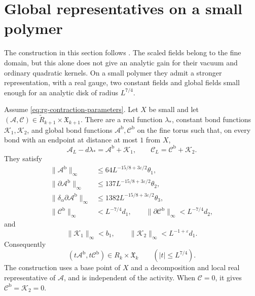 \section{Global representatives on a small polymer}
\label{subsec:rg-small-polymer-gauge}

The construction in this section follows \cite[\S12.7]{QED3Manuscript}.
The scaled fields belong to the fine domain, but this alone
does not give an analytic gain for their vacuum and ordinary
quadratic kernels. On a small polymer they admit a stronger
representation, with a real gauge, two constant fields and
global fields small enough for an analytic disk of radius
$L^{7/4}$.

\begin{proposition}\label{prop:rg-small-polymer-representatives}
Assume \eqref{eq:rg-contraction-parameters}. Let $X$ be small
and let $(\mathscr A,\mathscr C)\in
\widetilde R_{k+1}\times\mathfrak X_{k+1}$.
There are a real function $\lambda_*$, constant bond
functions $\mathscr K_1,\mathscr K_2$, and global bond
functions $\mathscr A^{\mathrm b},\mathscr C^{\mathrm b}$
on the fine torus such that, on every bond with an endpoint
at distance at most $1$ from $X$,
\begin{equation}\label{eq:rg-small-polymer-gauge-identity}
 \mathscr A_L-d\lambda_*=\mathscr A^{\mathrm b}+\mathscr K_1,
 \qquad
 \mathscr C_L=\mathscr C^{\mathrm b}+\mathscr K_2.
\end{equation}
They satisfy
\begin{equation}\label{eq:rg-small-polymer-global-bounds}
 \begin{split}
 \|\mathscr A^{\mathrm b}\|_\infty
          &\le64L^{-15/8+3\varepsilon/2}\theta_1,\\
 \|\partial\mathscr A^{\mathrm b}\|_\infty
          &\le137L^{-15/8+3\varepsilon/2}\theta_2,\\
 \|\delta_\alpha\partial\mathscr A^{\mathrm b}\|_\infty
          &\le1382L^{-15/8+3\varepsilon/2}\theta_3,\\
 \|\mathscr C^{\mathrm b}\|_\infty&<L^{-7/4}d_1,\qquad
 \|\partial\mathscr C^{\mathrm b}\|_\infty<L^{-7/4}d_2,
 \end{split}
\end{equation}
and
\begin{equation}\label{eq:rg-small-polymer-constant-bounds}
 \|\mathscr K_1\|_\infty<b_1,\qquad
 \|\mathscr K_2\|_\infty<L^{-1+\varepsilon}d_1.
\end{equation}
Consequently
\begin{equation}\label{eq:rg-small-polymer-analytic-disk}
 (t\mathscr A^{\mathrm b},t\mathscr C^{\mathrm b})
                       \in R_k\times\mathfrak X_k
                             \qquad(|t|\le L^{7/4}).
\end{equation}
The construction uses a base point of $X$ and a decomposition
and local real representative of $\mathscr A$, and is
independent of the activity. When $\mathscr C=0$, it gives
$\mathscr C^{\mathrm b}=\mathscr K_2=0$.
\end{proposition}

